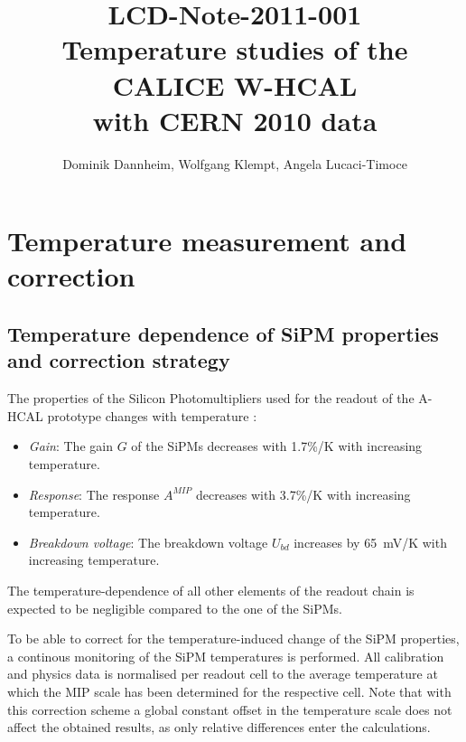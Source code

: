 \documentclass[a4paper,10pt]{article}
\title{ {\normalsize LCD-Note-2011-001 \\ \vspace{5mm}}
{Temperature studies of the CALICE W-HCAL \\ with CERN 2010 data}}
\author{Dominik Dannheim, Wolfgang Klempt, Angela Lucaci-Timoce}
\begin{document}
\maketitle


\section{Temperature measurement and correction}
\subsection{Temperature dependence of SiPM properties and correction strategy}
The properties of the Silicon Photomultipliers used for the readout of the A-HCAL prototype changes 
with temperature \cite{niels-diplomarbeit}:
\begin{itemize}
\item \emph{Gain}:  The gain $G$ of the SiPMs decreases with 1.7\%/K with increasing temperature. 

\item \emph{Response}: The response $A^{MIP}$ decreases with 3.7\%/K with increasing temperature. 

\item \emph{Breakdown voltage}: The breakdown voltage $U_{bd}$ increases by 65~mV/K with increasing temperature.
\end{itemize}

The temperature-dependence of all other elements of the readout chain is expected to be negligible
compared to the one of the SiPMs. 

To be able to correct for the temperature-induced change of the SiPM properties, a continous monitoring
of the SiPM temperatures is performed. All calibration and physics data is normalised per readout cell
to the average temperature at which the MIP scale has been determined for the respective cell. Note that with
this correction scheme a global constant offset in the temperature scale does not affect the obtained results,
as only relative differences enter the calculations.
\end{document}
